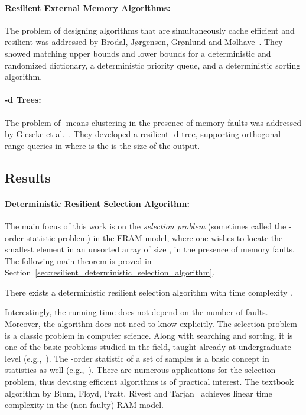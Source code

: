 \documentclass{llncs}
\begin{document}
\paragraph{Resilient External Memory Algorithms:}

	The problem of designing algorithms that are simultaneously
	cache efficient and resilient was addressed by
	Brodal, J{\o}rgensen, Gr{\o}nlund and M{\o}lhave~\cite{resilient_and_external_memory}.
	They showed matching upper \linebreak bounds and lower bounds
	for a deterministic and randomized dictionary,
	a deterministic priority queue,
	and a deterministic sorting algorithm.

\paragraph{-d Trees:}

	The problem of -means clustering in the presence of memory faults
	was addressed by Gieseke et al.~\cite{kd_trees}.
	They developed a resilient -d tree,
	supporting orthogonal range queries in
	 where  is the is the size of the output.










\subsection{Results}

\paragraph{Deterministic Resilient Selection Algorithm:}

The main focus of this work is on the \emph{selection problem} (sometimes called the -order statistic problem) in the FRAM model, where one wishes to locate the  smallest element in an unsorted array of size , in the presence of memory faults. The following main theorem is proved in Section~\ref{sec:resilient_deterministic_selection_algorithm}.

\begin{theorem}
There exists a deterministic resilient selection algorithm with time complexity .
\end{theorem}

Interestingly, the running time does not depend on the number of faults. Moreover, the algorithm does not need to know  explicitly. The selection problem is a classic problem in computer science. Along with searching and sorting, it is one of the basic problems studied in the field, taught already at undergraduate level (e.g.,~\cite{CLRS}). The -order statistic of a set of samples is a basic concept in statistics as well (e.g.,~\cite{order_statistics}). There are numerous applications for the selection problem, thus devising efficient algorithms is of practical interest. The textbook algorithm by Blum, Floyd, Pratt, Rivest and Tarjan~\cite{median_of_medians_algorithm}
achieves linear time complexity in the (non-faulty) RAM model.
\end{document}
